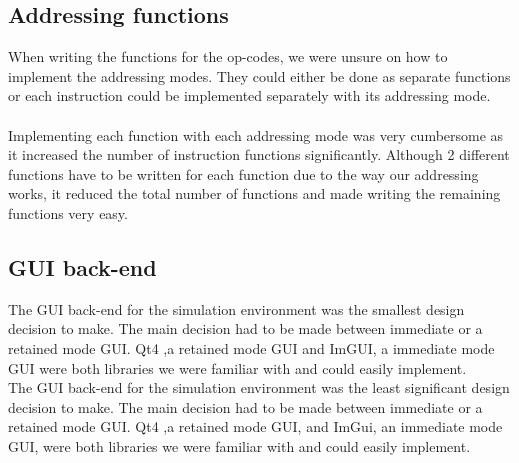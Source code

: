 \documentclass[conference]{IEEEtran}
\begin{document}
\subsection{Addressing functions}

When writing the functions for the op-codes, we were unsure on how to implement the addressing modes. They could either be done as separate functions or each instruction could be implemented separately with its addressing mode.\\

\\

Implementing each function with each addressing mode was very cumbersome as it increased the number of instruction functions significantly. Although 2 different functions have to be written for each function due to the way our addressing works, it reduced the total number of functions and made writing the remaining functions very easy. 

\subsection{GUI back-end}

The GUI back-end for the simulation environment was the smallest design decision to make. The main decision had to be made between immediate or a retained mode GUI. Qt4 ,a retained mode GUI and ImGUI, a immediate mode GUI were both libraries we were familiar with and could easily implement. \\
The GUI back-end for the simulation environment was the least significant design decision to make. The main decision had to be made between immediate or a retained mode GUI. Qt4 ,a retained mode GUI, and ImGui, an immediate mode GUI, were both libraries we were familiar with and could easily implement. \\

\\
\end{document}
